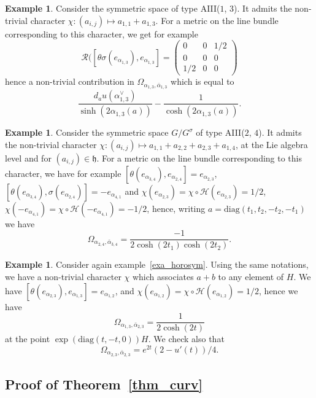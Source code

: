 \documentclass{amsart}
\theoremstyle{definition}
\newtheorem{exa}[thm]{Example}
\begin{document}
\begin{exa}
Consider the symmetric space of type AIII($1$, $3$). 
It admits the non-trivial character $\chi:(a_{i,j})\mapsto a_{1,1}+a_{1,3}$. 
For a metric on the line bundle corresponding to this character, 
we get for example 
\[
\mathcal{R}([\theta\sigma(e_{\alpha_{1,3}}),e_{\alpha_{1,3}}]=
\begin{pmatrix}0&0&1/2\\0&0&0\\1/2&0&0\end{pmatrix}
\]
hence a non-trivial contribution in $\Omega_{\alpha_{1,3},\bar{\alpha}_{1,3}}$ 
which is equal to 
\[
\frac{d_au(\alpha_{1,3}^{\vee})}{\sinh(2\alpha_{1,3}(a))}-\frac{1}{\cosh(2\alpha_{1,3}(a))}.
\]
\end{exa}

\begin{exa}
Consider the symmetric space $G/G^{\sigma}$ of type AIII($2$, $4$). 
It admits the non-trivial character $\chi:(a_{i,j})\mapsto a_{1,1}+a_{2,2}+a_{2,3}+a_{1,4}$, 
at the Lie algebra level and for $(a_{i,j})\in \mathfrak{h}$. 
For a metric on the line bundle corresponding to this character, 
we have for example 
$[\theta(e_{\alpha_{3,4}}),e_{\alpha_{2,4}}]=e_{\alpha_{2,3}}$,  
$[\theta(e_{\alpha_{3,4}}),\sigma(e_{\alpha_{2,4}})]=-e_{\alpha_{4,1}}$
and $\chi(e_{\alpha_{2,3}})=\chi\circ\mathcal{H}(e_{\alpha_{2,3}})=1/2$,
$\chi(-e_{\alpha_{4,1}})=\chi\circ\mathcal{H}(-e_{\alpha_{4,1}})=-1/2$,
hence, writing $a=\mathrm{diag}(t_1,t_2,-t_2,-t_1)$ we have 
\[
\Omega_{\alpha_{2,4},\bar{\alpha}_{3,4}}=
\frac{-1}{2\cosh(2t_1)\cosh(2t_2)}.
\]
\end{exa}

\begin{exa}
Consider again example~\ref{exa_horosym}. Using the same notations, 
we have a non-trivial character $\chi$ which associates $a+b$ to 
any element of $H$.
We have 
$[\theta(e_{\alpha_{2,3}}),e_{\alpha_{1,3}}]=e_{\alpha_{1,2}}$, 
and $\chi(e_{\alpha_{1,2}})=\chi\circ\mathcal{H}(e_{\alpha_{1,2}})=1/2$, 
hence we have 
\[\Omega_{\alpha_{1,3},\bar{\alpha}_{2,3}}=\frac{1}{2\cosh(2t)}\]
at the point $\exp(\mathrm{diag}(t,-t,0))H$.
We  check also that 
\[
\Omega_{\alpha_{2,3},\bar{\alpha}_{2,3}}=e^{2t}(2-u'(t))/4.
\]
\end{exa}

\subsection{Proof of Theorem~\ref{thm_curv}}
\end{document}
